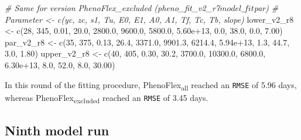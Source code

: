 \documentclass[
]{article}
\newenvironment{Shaded}{\begin{snugshade}}{\end{snugshade}}
\newcommand{\CommentTok}[1]{\textcolor[rgb]{0.56,0.35,0.01}{\textit{#1}}}
\newcommand{\DecValTok}[1]{\textcolor[rgb]{0.00,0.00,0.81}{#1}}
\newcommand{\FloatTok}[1]{\textcolor[rgb]{0.00,0.00,0.81}{#1}}
\newcommand{\FunctionTok}[1]{\textcolor[rgb]{0.00,0.00,0.00}{#1}}
\newcommand{\NormalTok}[1]{#1}
\newcommand{\OtherTok}[1]{\textcolor[rgb]{0.56,0.35,0.01}{#1}}
\begin{document}
\begin{Shaded}
\begin{Highlighting}[]
\CommentTok{\# Same for version PhenoFlex\_excluded (pheno\_fit\_v2\_r7$model\_fit$par)}
\CommentTok{\# Parameter \textless{}{-} c(yc,  zc,   s1,   Tu,     E0,      E1,     A0,       A1,   Tf,   Tc,   Tb, slope)}
\NormalTok{lower\_v2\_r8 }\OtherTok{\textless{}{-}} \FunctionTok{c}\NormalTok{(}\DecValTok{28}\NormalTok{, }\DecValTok{345}\NormalTok{, }\FloatTok{0.01}\NormalTok{, }\FloatTok{20.0}\NormalTok{, }\FloatTok{2800.0}\NormalTok{,  }\FloatTok{9600.0}\NormalTok{, }\FloatTok{5800.0}\NormalTok{, }\FloatTok{5.60e+13}\NormalTok{,  }\FloatTok{0.0}\NormalTok{, }\FloatTok{38.0}\NormalTok{,  }\FloatTok{0.0}\NormalTok{,  }\FloatTok{7.00}\NormalTok{)}
\NormalTok{par\_v2\_r8   }\OtherTok{\textless{}{-}} \FunctionTok{c}\NormalTok{(}\DecValTok{35}\NormalTok{, }\DecValTok{375}\NormalTok{, }\FloatTok{0.13}\NormalTok{, }\FloatTok{26.4}\NormalTok{, }\FloatTok{3371.0}\NormalTok{,  }\FloatTok{9901.3}\NormalTok{, }\FloatTok{6214.4}\NormalTok{, }\FloatTok{5.94e+13}\NormalTok{,  }\FloatTok{1.3}\NormalTok{, }\FloatTok{44.7}\NormalTok{,  }\FloatTok{3.0}\NormalTok{,  }\FloatTok{1.80}\NormalTok{)}
\NormalTok{upper\_v2\_r8 }\OtherTok{\textless{}{-}} \FunctionTok{c}\NormalTok{(}\DecValTok{40}\NormalTok{, }\DecValTok{405}\NormalTok{, }\FloatTok{0.30}\NormalTok{, }\FloatTok{30.2}\NormalTok{, }\FloatTok{3700.0}\NormalTok{, }\FloatTok{10300.0}\NormalTok{, }\FloatTok{6800.0}\NormalTok{, }\FloatTok{6.30e+13}\NormalTok{,  }\FloatTok{8.0}\NormalTok{, }\FloatTok{52.0}\NormalTok{,  }\FloatTok{8.0}\NormalTok{, }\FloatTok{30.00}\NormalTok{)}
\end{Highlighting}
\end{Shaded}

In this round of the fitting procedure, PhenoFlex\textsubscript{all}
reached an \texttt{RMSE} of 5.96 days, whereas
PhenoFlex\textsubscript{excluded} reached an \texttt{RMSE} of 3.45 days.

\hypertarget{ninth-model-run}{%
\subsection{Ninth model run}\label{ninth-model-run}}
\end{document}
